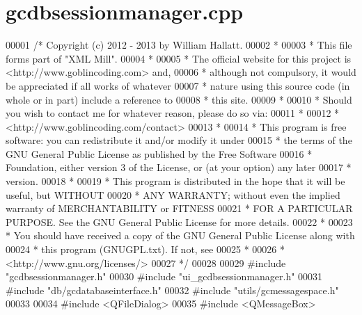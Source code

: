 \hypertarget{gcdbsessionmanager_8cpp_source}{\section{gcdbsessionmanager.\-cpp}
}

\begin{DoxyCode}
00001 \textcolor{comment}{/* Copyright (c) 2012 - 2013 by William Hallatt.}
00002 \textcolor{comment}{ *}
00003 \textcolor{comment}{ * This file forms part of "XML Mill".}
00004 \textcolor{comment}{ *}
00005 \textcolor{comment}{ * The official website for this project is <http://www.goblincoding.com> and,}
00006 \textcolor{comment}{ * although not compulsory, it would be appreciated if all works of whatever}
00007 \textcolor{comment}{ * nature using this source code (in whole or in part) include a reference to}
00008 \textcolor{comment}{ * this site.}
00009 \textcolor{comment}{ *}
00010 \textcolor{comment}{ * Should you wish to contact me for whatever reason, please do so via:}
00011 \textcolor{comment}{ *}
00012 \textcolor{comment}{ *                 <http://www.goblincoding.com/contact>}
00013 \textcolor{comment}{ *}
00014 \textcolor{comment}{ * This program is free software: you can redistribute it and/or modify it
       under}
00015 \textcolor{comment}{ * the terms of the GNU General Public License as published by the Free
       Software}
00016 \textcolor{comment}{ * Foundation, either version 3 of the License, or (at your option) any later}
00017 \textcolor{comment}{ * version.}
00018 \textcolor{comment}{ *}
00019 \textcolor{comment}{ * This program is distributed in the hope that it will be useful, but WITHOUT}
00020 \textcolor{comment}{ * ANY WARRANTY; without even the implied warranty of MERCHANTABILITY or
       FITNESS}
00021 \textcolor{comment}{ * FOR A PARTICULAR PURPOSE.  See the GNU General Public License for more
       details.}
00022 \textcolor{comment}{ *}
00023 \textcolor{comment}{ * You should have received a copy of the GNU General Public License along with}
00024 \textcolor{comment}{ * this program (GNUGPL.txt).  If not, see}
00025 \textcolor{comment}{ *}
00026 \textcolor{comment}{ *                    <http://www.gnu.org/licenses/>}
00027 \textcolor{comment}{ */}
00028 
00029 \textcolor{preprocessor}{#include "gcdbsessionmanager.h"}
00030 \textcolor{preprocessor}{#include "ui\_gcdbsessionmanager.h"}
00031 \textcolor{preprocessor}{#include "db/gcdatabaseinterface.h"}
00032 \textcolor{preprocessor}{#include "utils/gcmessagespace.h"}
00033 
00034 \textcolor{preprocessor}{#include <QFileDialog>}
00035 \textcolor{preprocessor}{#include <QMessageBox>}

\end{DoxyCode}
